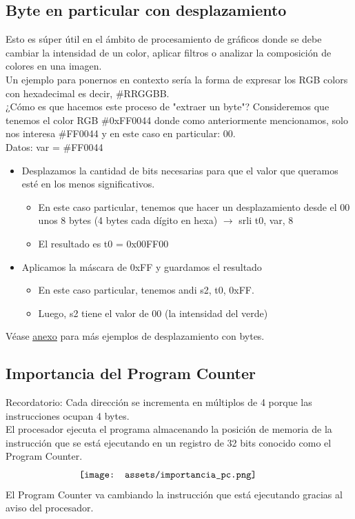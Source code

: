 \documentclass[10pt,a4paper]{article}
\begin{document}
\subsection*{Byte en particular con desplazamiento}
Esto es súper útil en el ámbito de procesamiento de gráficos donde se debe cambiar la intensidad de un color, aplicar filtros o analizar la composición de colores en una imagen. \\
Un ejemplo para ponernos en contexto sería la forma de expresar los RGB colors con hexadecimal es decir, \#RRGGBB. \\
¿Cómo es que hacemos este proceso de "extraer un byte"? Consideremos que tenemos el color RGB \#0xFF0044 donde como anteriormente mencionamos, solo nos interesa \#FF0044 y en este caso en particular: 00. \\
Datos: 
var = \#FF0044 
\begin{itemize}
    \item Desplazamos la cantidad de bits necesarias para que el valor que queramos esté en los menos significativos.
    \begin{itemize}
        \item En este caso particular, tenemos que hacer un desplazamiento desde el 00 unos 8 bytes (4 bytes cada dígito en hexa) $ \rightarrow $ srli t0, var, 8
        \item El resultado es t0 = 0x00FF00
    \end{itemize}
    \item Aplicamos la máscara de 0xFF y guardamos el resultado
    \begin{itemize}
        \item En este caso particular, tenemos andi s2, t0, 0xFF.
        \item Luego, s2 tiene el valor de 00 (la intensidad del verde)
    \end{itemize}
\end{itemize} 
Véase \hyperref[subsec:desplazamiento_bytes]{\underline{anexo}} para más ejemplos de desplazamiento con bytes.
\subsection*{Importancia del Program Counter}
Recordatorio: Cada dirección se incrementa en múltiplos de 4 porque las instrucciones ocupan 4 bytes. \\
El procesador ejecuta el programa almacenando la posición de memoria de la instrucción que se está ejecutando en un registro de 32 bits conocido como el Program Counter.
\[\begin{minipage}[b]{0.6\textwidth}
    \texttt{[image: assets/importancia\_pc.png]}
    \label{fig:importancia_pc}
\end{minipage}\] 
El Program Counter va cambiando la instrucción que está ejecutando gracias al aviso del procesador.
\end{document}
